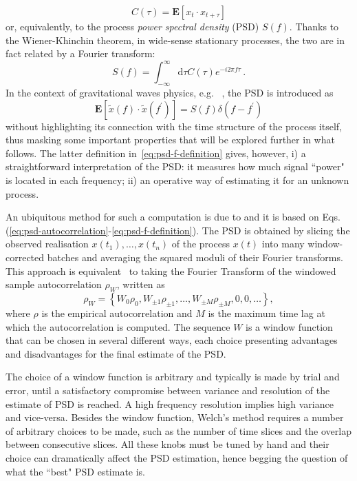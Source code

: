\documentclass{aa}
\begin{document}
\begin{equation}
	C(\tau) = \mathbf{E}[x_t \cdot x_{t+\tau}]
\end{equation}
or, equivalently, to the process \emph{power spectral density} (PSD) $S(f)$. Thanks to the Wiener-Khinchin theorem, in wide-sense stationary processes, the two are in fact related by a Fourier transform: 
\begin{equation}\label{eq:psd-autocorrelation}
	S(f) = \int_{-\infty}^{\infty} \textrm{d}\tau C(\tau) e^{-i 2 \pi f \tau}\,.
\end{equation}
In the context of gravitational waves physics, e.g. ~\citep{Finn_1992}, the PSD is introduced as  
\begin{equation}\label{eq:psd-f-definition}
	\mathbf{E}[\tilde{x}(f) \cdot \tilde{x}(f^\prime)] = S(f) \delta(f-f^\prime)
\end{equation}
without highlighting its connection with the time structure of the process itself, thus masking some important properties that will be explored further in what follows. The latter definition in~\eqref{eq:psd-f-definition} gives, however, i) a straightforward interpretation of the PSD: it measures how much signal ``power" is located in each frequency; ii) an operative way of estimating it for an unknown process.  

An ubiquitous method for such a computation is due to \citet{Welch1967} and it is based on Eqs.(\ref{eq:psd-autocorrelation}-\ref{eq:psd-f-definition}).
The PSD is obtained by slicing the observed realisation $x(t_1),\ldots,x(t_n)$ of the process $x(t)$ into many window-corrected batches and averaging the squared moduli of their Fourier transforms.
This approach is equivalent~\citep{Lomb,Scargle} to taking the Fourier Transform of the windowed sample autocorrelation $\rho_W$, written as
\begin{equation}
    \rho_{W} = \left\{W_0\rho_0,W_{\pm 1}\rho_{\pm 1}, \dots, W_{\pm M}\rho_{\pm M}, 0, 0, \dots \right\},
\end{equation}
where $\rho$ is the empirical autocorrelation and $M$ is the maximum time lag at which the autocorrelation is computed.
The sequence $W$ is a window function that can be chosen in several different ways, each choice presenting advantages and disadvantages for the final estimate of the PSD.

The choice of a window function is arbitrary and typically is made by trial and error, until a satisfactory compromise between variance and resolution of the estimate of PSD is reached. A high frequency resolution implies high variance and vice-versa.
Besides the window function, Welch's method requires a number of arbitrary choices to be made, such as the number of time slices and the overlap between consecutive slices. All these knobs must be tuned by hand and their choice can dramatically affect the PSD estimation, hence begging the question of what the ``best" PSD estimate is.
\end{document}
